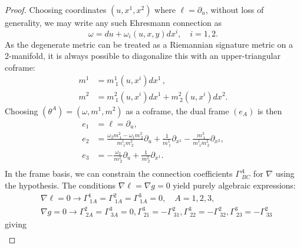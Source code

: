 \documentclass[10pt,a4paper]{amsart}
\newcommand{\ai}{A}
\newcommand{\bb}{B}
\newcommand{\cc}{C}
\begin{document}
\begin{proof}
    Choosing coordinates $(u,x^1,x^2)$ where $\ell = \partial_u$, without loss of generality, we may write any such Ehresmann connection as
    \begin{equation} 
        \omega = du + \omega_i (u,x,y) dx^i,\quad i =1,2. 
    \end{equation} 
    As the degenerate metric can be treated as a Riemannian signature metric on a 2-manifold, it is always possible to diagonalize this with an upper-triangular coframe:
     \begin{equation} \begin{aligned}
       m^1 &= m^1_{~1}(u, x^i) dx^1\,, \\
       m^2 &= m^2_{~1}(u,x^i) dx^1 + m^2_{~2}(u,x^i) dx^2.
    \end{aligned} \end{equation}
    Choosing $(\theta^\ai) = (\omega, m^1, m^2)$ as a coframe, the dual frame $(e_\ai)$ is then 
    \begin{equation} \begin{aligned}
        e_1 &= \ell = \partial_u, \\
        e_2 &= \frac{\omega_2 m^2_{~1} - \omega_1 m^2_{~2}}{m^1_{~1} m^2_{~2}} \partial_u + \frac{1}{m^1_{~1}} \partial_{x^1} - \frac{m^2_{~1}}{m^1_{~1} m^2_{~2}} \partial_{x^2}, \\
        e_3 &= - \frac{\omega_2}{m^2_{~2}} \partial_{u} + \frac{1}{m^2_{~2}} \partial_{x^1} .\\ 
    \end{aligned} \end{equation}
    In the frame basis, we can constrain the connection coefficients $\Gamma^\ai_{~\bb\cc}$ for $\nabla$ using the hypothesis. The conditions $\nabla \ell = \nabla g  =0$ yield purely algebraic expressions:
    \begin{equation}
    \begin{aligned}
        & \nabla \ell = 0 \rightarrow  \Gamma^{1}_{~1\ai}= \Gamma^{2}_{~1\ai}=\Gamma^{3}_{~1\ai} = 0, \quad \ai = 1,2,3, \\
        &\nabla g= 0 \rightarrow \Gamma^{2}_{~2\ai}=\Gamma^{3}_{~3\ai}=0, \Gamma^{3}_{~21} = -\Gamma^{2}_{~31}, \Gamma^{3}_{~22} = -\Gamma^{2}_{~32},\Gamma^{3}_{~23} = -\Gamma^{2}_{~33} 
    \end{aligned}
    \end{equation}
    giving
    \begin{equation} \begin{aligned}

\end{aligned}
\end{equation}
\end{proof}
\end{document}
